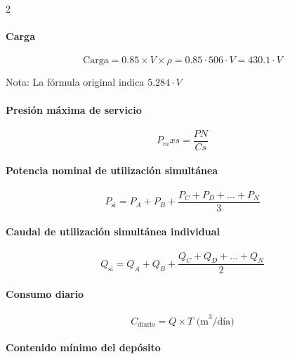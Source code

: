 \documentclass[11pt]{article}
\begin{document}
\begin{multicols*}{2}
    \paragraph{Carga}

    \begin{equation*}
        \text{Carga} = 0.85 \times V \times \rho = 0.85 \cdot 506 \cdot V = 430.1 \cdot V
    \end{equation*}

    Nota: La fórmula original indica $5.284 \cdot V$

    \paragraph{Presión máxima de servicio}

    \begin{equation*}
        P_mxs = \frac{PN}{Cs}
    \end{equation*}

    \paragraph{Potencia nominal de utilización simultánea}

    \begin{equation*}
        P_{\text{si}} = P_A + P_B + \frac{P_C + P_D + \dots + P_N}{3}
    \end{equation*}

    \paragraph{Caudal de utilización simultánea individual}

    \begin{equation*}
        Q_{\text{si}} = Q_A + Q_B + \frac{Q_C + Q_D + \dots + Q_N}{2}
    \end{equation*}

    \paragraph{Consumo diario}

    \begin{equation*}
        C_{\text{diario}} = Q \times T \text{ (m}^3\text{/día)}
    \end{equation*}

    \paragraph{Contenido mínimo del depósito}


\end{multicols*}
\end{document}
